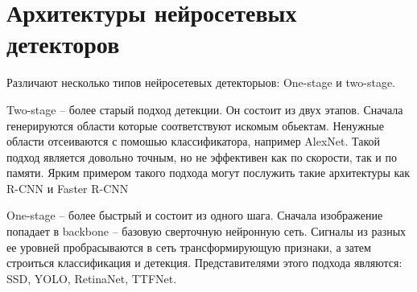 \section{Архитектуры нейросетевых детекторов}

Различают несколько типов нейросетевых детекторыов: One-stage и two-stage.

Two-stage -- более старый подход детекции. Он состоит из двух этапов. Сначала генерируются области которые соответствуют искомым обьектам. Ненужные области отсеиваются с помошью классификатора, например AlexNet. Такой подход является довольно точным, но не эффективен как по скорости, так и по памяти. Ярким примером такого подхода могут послужить такие архитектуры как R-CNN и Faster R-CNN

One-stage -- более быстрый и состоит из одного шага. Сначала изображение попадает в backbone -- базовую сверточную нейронную сеть. Сигналы из разных ее уровней пробрасываются в сеть трансформирующую признаки, а затем строиться классификация и детекция. Представителями этого подхода являются: SSD, YOLO, RetinaNet, TTFNet.



\clearpage